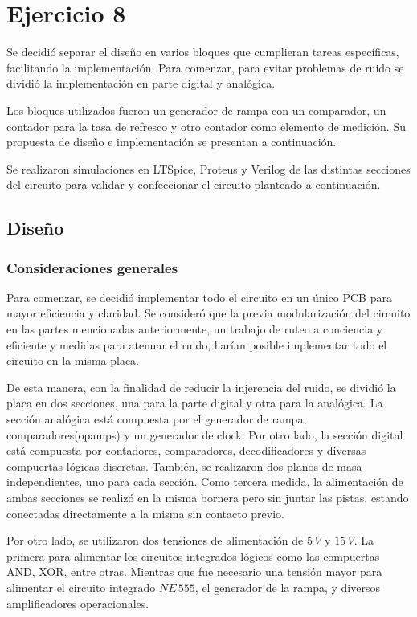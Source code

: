 \section{Ejercicio 8}

Se decidió separar el diseño en varios bloques que cumplieran tareas específicas, facilitando la implementación. Para comenzar, para evitar problemas de ruido se dividió la implementación en parte digital y analógica.\par
Los bloques utilizados fueron un generador de rampa con un comparador, un contador para la tasa de refresco y otro contador como elemento de medición. Su propuesta de diseño e implementación se presentan a continuación. \par
Se realizaron simulaciones en LTSpice, Proteus y Verilog de las distintas secciones del circuito para validar y confeccionar el circuito planteado a continuación.

\subsection{Diseño}

\subsubsection{Consideraciones generales}

Para comenzar, se decidió implementar todo el circuito en un único PCB para mayor eficiencia y claridad. Se consideró que la previa modularización del circuito en las partes mencionadas anteriormente, un trabajo de ruteo a conciencia y eficiente y medidas para atenuar el ruido, harían posible implementar todo el circuito en la misma placa. \par De esta manera, con la finalidad de reducir la injerencia del ruido, se dividió la placa en dos secciones, una para la parte digital y otra para la analógica. La sección analógica está compuesta por el generador de rampa, comparadores(opamps) y un generador de clock. Por otro lado, la sección digital está compuesta por contadores, comparadores, decodificadores y diversas compuertas lógicas discretas. También, se realizaron dos planos de masa independientes, uno para cada sección. Como tercera medida, la alimentación de ambas secciones se realizó en la misma bornera pero sin juntar las pistas, estando conectadas directamente a la misma sin contacto previo. \par 


Por otro lado, se utilizaron dos tensiones de alimentación de $5\,V$ y $15\,V$. La primera para alimentar los circuitos integrados lógicos como las compuertas AND, XOR, entre otras. Mientras que fue necesario una tensión mayor para alimentar el circuito integrado $NE\,555$, el generador de la rampa, y diversos amplificadores operacionales.\par

